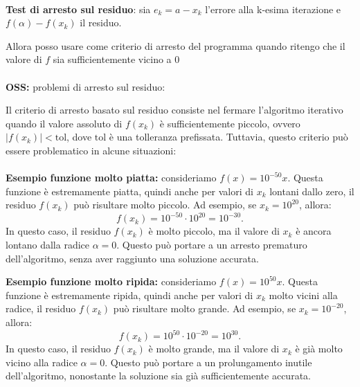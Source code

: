 \documentclass[a4paper, 11pt]{article}
\begin{document}
        \paragraph{}
        \textbf{Test di arresto sul residuo}: sia $e_k = a-x_k$ l'errore alla k-esima iterazione e $f(\alpha) - f(x_k)$ il residuo. 

        Allora posso usare come criterio di arresto del programma quando ritengo che il valore di $f$ sia sufficientemente vicino a 0

        \paragraph{}
        \textbf{OSS: } problemi di arresto sul residuo:

        Il criterio di arresto basato sul residuo consiste nel fermare l'algoritmo iterativo quando il valore assoluto di \( f(x_k) \) è sufficientemente piccolo, ovvero \( |f(x_k)| < \text{tol} \), dove \(\text{tol}\) è una tolleranza prefissata. Tuttavia, questo criterio può essere problematico in alcune situazioni:

        \paragraph{}
        \textbf{Esempio funzione molto piatta:} consideriamo \( f(x) = 10^{-50}x \). Questa funzione è estremamente piatta, quindi anche per valori di \( x_k \) lontani dallo zero, il residuo \( f(x_k) \) può risultare molto piccolo. Ad esempio, se \( x_k = 10^{20} \), allora:
        \[
            f(x_k) = 10^{-50} \cdot 10^{20} = 10^{-30}.
        \]
        In questo caso, il residuo \( f(x_k) \) è molto piccolo, ma il valore di \( x_k \) è ancora lontano dalla radice \( \alpha = 0 \). Questo può portare a un arresto prematuro dell'algoritmo, senza aver raggiunto una soluzione accurata.

        \textbf{Esempio funzione molto ripida:} consideriamo \( f(x) = 10^{50}x \). Questa funzione è estremamente ripida, quindi anche per valori di \( x_k \) molto vicini alla radice, il residuo \( f(x_k) \) può risultare molto grande. Ad esempio, se \( x_k = 10^{-20} \), allora:
        \[
            f(x_k) = 10^{50} \cdot 10^{-20} = 10^{30}.
        \]
        In questo caso, il residuo \( f(x_k) \) è molto grande, ma il valore di \( x_k \) è già molto vicino alla radice \( \alpha = 0 \). Questo può portare a un prolungamento inutile dell'algoritmo, nonostante la soluzione sia già sufficientemente accurata.
\end{document}
